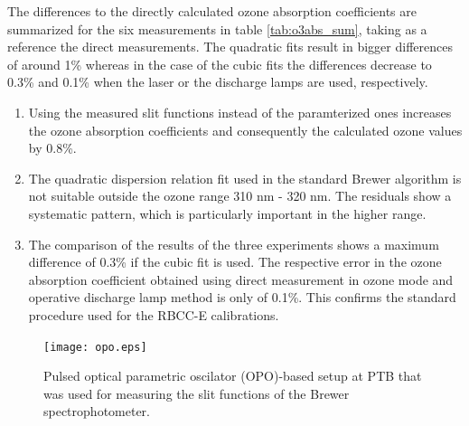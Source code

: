 \documentclass[acp, manuscript]{copernicus}
\begin{document}
The differences to the directly calculated ozone absorption coefficients are summarized for the six measurements in table \ref{tab:o3abs_sum}, taking as a reference the direct measurements. The quadratic fits result in bigger differences of around 1\% whereas in the case of the cubic fits the differences decrease to 0.3\% and  0.1\%  when the laser or the discharge lamps are used, respectively.   




\conclusions{}

\begin{enumerate}


    \item Using the measured slit functions instead of the paramterized ones increases the ozone absorption coefficients and consequently the calculated ozone values by 0.8\%.

    \item The quadratic dispersion relation fit used in the standard Brewer algorithm is not suitable outside the ozone range 310 nm - 320 nm. The residuals show a systematic pattern, which is particularly important in the higher range.%

    \item The comparison of the results of the three experiments shows a maximum difference of 0.3\% if the cubic fit is used. The respective error in the ozone absorption coefficient obtained using direct measurement in ozone mode and operative discharge lamp method is only of 0.1\%. This confirms the standard procedure used for the RBCC-E calibrations.

\end{enumerate}




\clearpage
\begin{figure}[t]
\texttt{[image: opo.eps]}
\caption{Pulsed optical parametric oscilator (OPO)-based setup at PTB that was used for measuring the slit functions of the Brewer spectrophotometer.}
\label{fig:opo}
\end{figure}
\end{document}
